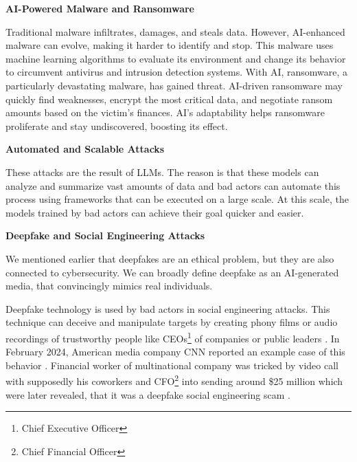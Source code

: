 \textbf{AI-Powered Malware and Ransomware}

Traditional malware infiltrates, damages, and steals data. However, AI-enhanced malware can evolve, making it harder to identify and stop. This malware uses machine learning algorithms to evaluate its environment and change its behavior to circumvent antivirus and intrusion detection systems.
With AI, ransomware, a particularly devastating malware, has gained threat. AI-driven ransomware may quickly find weaknesses, encrypt the most critical data, and negotiate ransom amounts based on the victim's finances. AI's adaptability helps ransomware proliferate and stay undiscovered, boosting its effect\cite{Princess-Egbuna_2021}.

\textbf{Automated and Scalable Attacks}

These attacks are the result of LLMs. The reason is that these models can analyze and summarize vast amounts of data and bad actors can automate this process using frameworks that can be executed on a large scale. At this scale, the models trained by bad actors can achieve their goal quicker and easier.

\textbf{Deepfake and Social Engineering Attacks}

We mentioned earlier that deepfakes are an ethical problem, but they are also connected to cybersecurity. We can broadly define deepfake as an AI-generated media, that convincingly mimics real individuals.

Deepfake technology is used by bad actors in social engineering attacks. This technique can deceive and manipulate targets by creating phony films or audio recordings of trustworthy people like CEOs\footnote{Chief Executive Officer} of companies or public leaders \cite{Princess-Egbuna_2021}. In February 2024, American media company CNN reported an example case of this behavior \cite{deepfake_CFO}. Financial worker of multinational company was tricked by video call with supposedly his coworkers and CFO\footnote{Chief Financial Officer} into sending around \$25 million which were later revealed, that it was a deepfake social engineering scam \cite{deepfake_CFO}.

